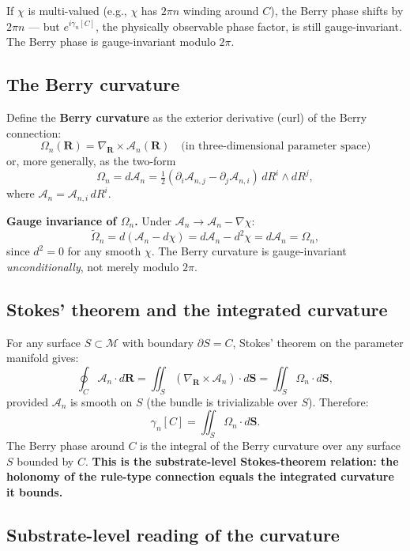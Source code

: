 \documentclass[11pt,a4paper]{article}
\begin{document}
If $\chi$ is multi-valued (e.g., $\chi$ has $2\pi n$ winding around $C$), the Berry phase shifts by $2\pi n$ --- but $e^{i\gamma_n[C]}$, the physically observable phase factor, is still gauge-invariant. The Berry phase is gauge-invariant modulo $2\pi$.

\subsection{The Berry curvature}

Define the \textbf{Berry curvature} as the exterior derivative (curl) of the Berry connection:
\[
\Omega_n(\mathbf{R}) = \nabla_\mathbf{R} \times \mathcal{A}_n(\mathbf{R}) \quad \text{(in three-dimensional parameter space)}
\]
or, more generally, as the two-form
\[
\Omega_n = d\mathcal{A}_n = \tfrac{1}{2}(\partial_i \mathcal{A}_{n,j} - \partial_j \mathcal{A}_{n,i}) \, dR^i \wedge dR^j,
\]
where $\mathcal{A}_n = \mathcal{A}_{n,i}\, dR^i$.

\textbf{Gauge invariance of $\Omega_n$.} Under $\mathcal{A}_n \to \mathcal{A}_n - \nabla\chi$:
\[
\tilde\Omega_n = d(\mathcal{A}_n - d\chi) = d\mathcal{A}_n - d^{2}\chi = d\mathcal{A}_n = \Omega_n,
\]
since $d^2 = 0$ for any smooth $\chi$. The Berry curvature is gauge-invariant \emph{unconditionally}, not merely modulo $2\pi$.

\subsection{Stokes' theorem and the integrated curvature}

For any surface $S \subset \mathcal{M}$ with boundary $\partial S = C$, Stokes' theorem on the parameter manifold gives:
\[
\oint_C \mathcal{A}_n \cdot d\mathbf{R} = \iint_S (\nabla_\mathbf{R} \times \mathcal{A}_n) \cdot d\mathbf{S} = \iint_S \Omega_n \cdot d\mathbf{S},
\]
provided $\mathcal{A}_n$ is smooth on $S$ (the bundle is trivializable over $S$). Therefore:
\[
\gamma_n[C] = \iint_S \Omega_n \cdot d\mathbf{S}.
\]
The Berry phase around $C$ is the integral of the Berry curvature over any surface $S$ bounded by $C$. \textbf{This is the substrate-level Stokes-theorem relation: the holonomy of the rule-type connection equals the integrated curvature it bounds.}

\subsection{Substrate-level reading of the curvature}
\end{document}
